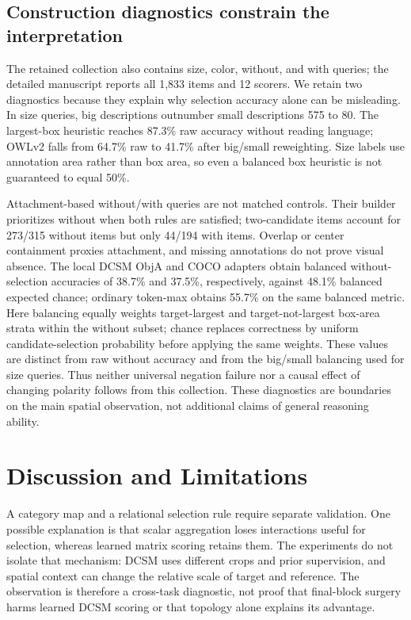 \documentclass[10pt,twocolumn,letterpaper]{article}
\begin{document}
\subsection{Construction diagnostics constrain the
interpretation}\label{construction-diagnostics-constrain-the-interpretation}

The retained collection also contains size, color, without, and with
queries; the detailed manuscript reports all 1,833 items and 12 scorers.
We retain two diagnostics because they explain why selection accuracy
alone can be misleading. In size queries, big descriptions outnumber
small descriptions 575 to 80. The largest-box heuristic reaches 87.3\%
raw accuracy without reading language; OWLv2 falls from 64.7\% raw to
41.7\% after big/small reweighting. Size labels use annotation area
rather than box area, so even a balanced box heuristic is not guaranteed
to equal 50\%.

Attachment-based without/with queries are not matched controls. Their
builder prioritizes without when both rules are satisfied; two-candidate
items account for 273/315 without items but only 44/194 with items.
Overlap or center containment proxies attachment, and missing
annotations do not prove visual absence. The local DCSM ObjA and COCO
adapters obtain balanced without-selection accuracies of 38.7\% and
37.5\%, respectively, against 48.1\% balanced expected chance; ordinary
token-max obtains 55.7\% on the same balanced metric. Here balancing
equally weights target-largest and target-not-largest box-area strata
within the without subset; chance replaces correctness by uniform
candidate-selection probability before applying the same weights. These
values are distinct from raw without accuracy and from the big/small
balancing used for size queries. Thus neither universal negation failure
nor a causal effect of changing polarity follows from this collection.
These diagnostics are boundaries on the main spatial observation, not
additional claims of general reasoning ability.

\balance
\section{Discussion and Limitations}\label{discussion-and-limitations}

A category map and a relational selection rule require separate
validation. One possible explanation is that scalar aggregation loses
interactions useful for selection, whereas learned matrix scoring
retains them. The experiments do not isolate that mechanism: DCSM uses
different crops and prior supervision, and spatial context can change
the relative scale of target and reference. The observation is therefore
a cross-task diagnostic, not proof that final-block surgery harms
learned DCSM scoring or that topology alone explains its advantage.
\end{document}
